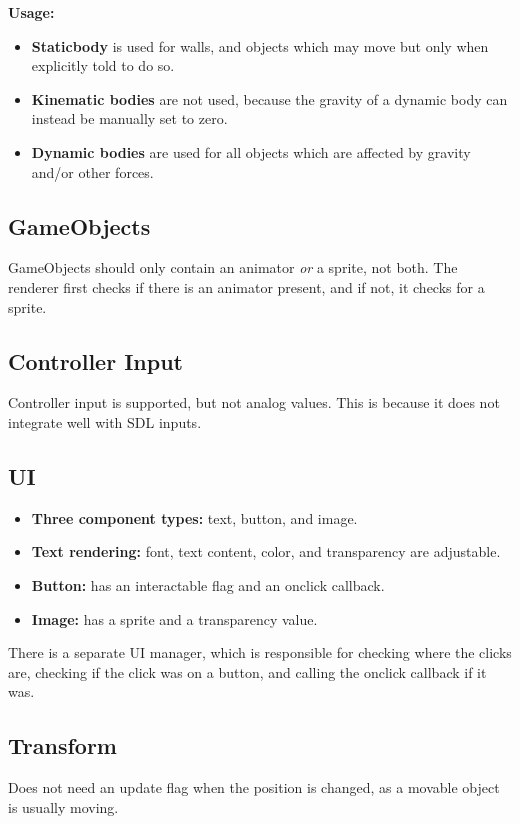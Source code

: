 \documentclass{article}
\begin{document}
\noindent
\textbf{Usage:}
\begin{itemize}
  \item \textbf{Staticbody} is used for walls, and objects which may move but only when explicitly told to do so.
  \item \textbf{Kinematic bodies} are not used, because the gravity of a dynamic body can instead be manually set to zero.
  \item \textbf{Dynamic bodies} are used for all objects which are affected by gravity and/or other forces.
\end{itemize}

\subsection{GameObjects}
GameObjects should only contain an animator \textit{or} a sprite, not both. The renderer first checks if there is an animator present, and if not, it checks for a sprite.

\subsection{Controller Input}
Controller input is supported, but not analog values. This is because it does not integrate well with SDL inputs.

\subsection{UI}
\begin{itemize}
  \item \textbf{Three component types:} text, button, and image.
  \item \textbf{Text rendering:} font, text content, color, and transparency are adjustable.
  \item \textbf{Button:} has an interactable flag and an onclick callback.
  \item \textbf{Image:} has a sprite and a transparency value.
\end{itemize}

\noindent
There is a separate UI manager, which is responsible for checking where the clicks are, checking if the click was on a button, and calling the onclick callback if it was.

\subsection{Transform}
Does not need an update flag when the position is changed, as a movable object is usually moving.
\end{document}
